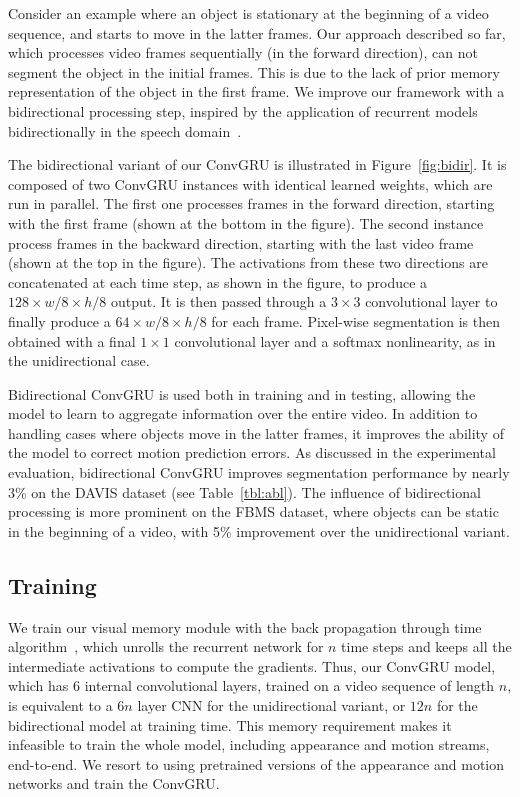 \documentclass[10pt,twocolumn,letterpaper]{article}
\begin{document}
Consider an example where an object is stationary at the beginning of a video
sequence, and starts to move in the latter frames. Our approach described so
far, which processes video frames sequentially (in the forward direction), can
not segment the object in the initial frames.  This is due to the lack of prior
memory representation of the object in the first frame. We improve our
framework with a bidirectional processing step, inspired by the application of
recurrent models bidirectionally in the speech
domain~\cite{graves2005framewise,graves2013hybrid}.

The bidirectional variant of our ConvGRU is illustrated in
Figure~\ref{fig:bidir}. It is composed of two ConvGRU instances with identical
learned weights, which are run in parallel. The first one processes frames in
the forward direction, starting with the first frame (shown at the bottom in
the figure). The second instance process frames in the backward direction,
starting with the last video frame (shown at the top in the figure). The
activations from these two directions are concatenated at each time step, as
shown in the figure, to produce a $128 \times w/8 \times h/8$ output. It is
then passed through a $3 \times 3$ convolutional layer to finally produce a $64
\times w/8 \times h/8$ for each frame. Pixel-wise segmentation is then obtained
with a final $1 \times 1$ convolutional layer and a softmax nonlinearity, as in
the unidirectional case.

Bidirectional ConvGRU is used both in training and in testing, allowing the
model to learn to aggregate information over the entire video. In addition to
handling cases where objects move in the latter frames, it improves the ability
of the model to correct motion prediction errors. As discussed in the
experimental evaluation, bidirectional ConvGRU improves segmentation
performance by nearly 3\% on the DAVIS dataset (see Table~\ref{tbl:abl}). The
influence of bidirectional processing is more prominent on the FBMS dataset, where objects can be static in the beginning of a video,
with 5\% improvement over the unidirectional variant.

\subsection{Training}
\label{sec:train}
We train our visual memory module with the back propagation through time
algorithm~\cite{werbos1990backpropagation}, which unrolls the recurrent network
for $n$ time steps and keeps all the intermediate activations to compute the
gradients. Thus, our ConvGRU model, which has 6 internal convolutional layers,
trained on a video sequence of length $n$, is equivalent to a $6n$ layer CNN
for the unidirectional variant, or $12n$ for the bidirectional model at
training time. This memory requirement makes it infeasible to train the
whole model, including appearance and motion streams, end-to-end. We resort to
using pretrained versions of the appearance and motion networks and train the
ConvGRU.
\end{document}
